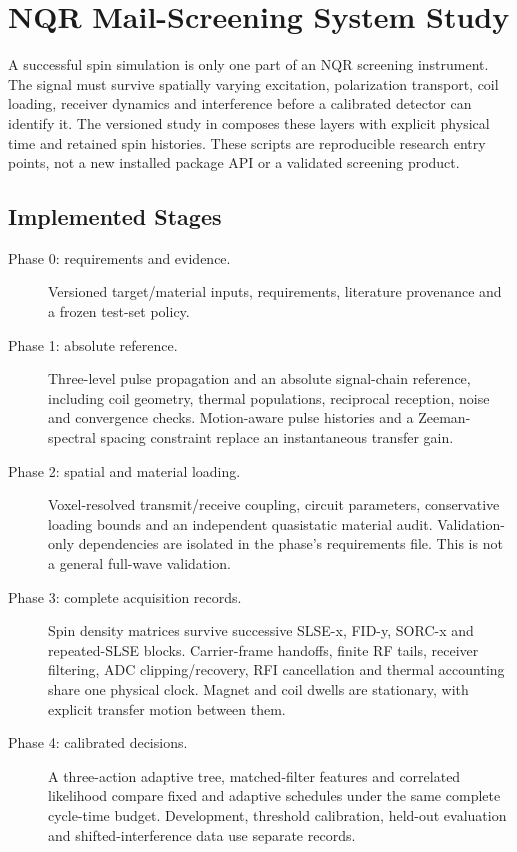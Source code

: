 \chapter{NQR Mail-Screening System Study}
\label{chap:nqr-screening}

A successful spin simulation is only one part of an NQR screening instrument.
The signal must survive spatially varying excitation, polarization transport,
coil loading, receiver dynamics and interference before a calibrated detector
can identify it. The versioned study in
 composes these layers with explicit physical
time and retained spin histories. These scripts are reproducible research
entry points, not a new installed package API or a validated screening product.


\section{Implemented Stages}

\begin{description}
\item[Phase 0: requirements and evidence.] Versioned target/material inputs,
requirements, literature provenance and a frozen test-set policy.
\item[Phase 1: absolute reference.] Three-level pulse propagation and an
absolute signal-chain reference, including coil geometry, thermal populations,
reciprocal reception, noise and convergence checks. Motion-aware pulse histories
and a Zeeman-spectral spacing constraint replace an instantaneous transfer gain.
\item[Phase 2: spatial and material loading.] Voxel-resolved transmit/receive
coupling, circuit parameters, conservative loading bounds and an independent
quasistatic material audit. Validation-only dependencies are isolated in
the phase's requirements file. This is not a general full-wave validation.
\item[Phase 3: complete acquisition records.] Spin density matrices survive
successive SLSE-x, FID-y, SORC-x and repeated-SLSE blocks. Carrier-frame handoffs,
finite RF tails, receiver filtering, ADC clipping/recovery, RFI cancellation and
thermal accounting share one physical clock. Magnet and coil dwells are
stationary, with explicit transfer motion between them.
\item[Phase 4: calibrated decisions.] A three-action adaptive tree, matched-filter
features and correlated likelihood compare fixed and adaptive schedules under
the same complete cycle-time budget. Development, threshold calibration,
held-out evaluation and shifted-interference data use separate records.
\end{description}

